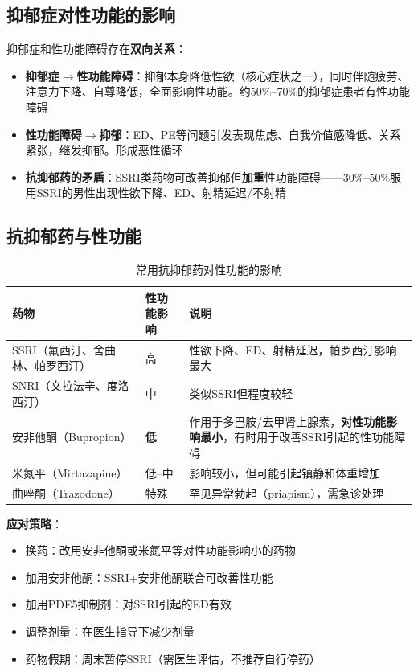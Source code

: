 \begin{enumerate}
\subsection{抑郁症对性功能的影响}

抑郁症和性功能障碍存在\textbf{双向关系}：

\begin{itemize}[leftmargin=2cm]
	\item \textbf{抑郁症$\rightarrow$性功能障碍}：抑郁本身降低性欲（核心症状之一），同时伴随疲劳、注意力下降、自尊降低，全面影响性功能。约50\%--70\%的抑郁症患者有性功能障碍
	\item \textbf{性功能障碍$\rightarrow$抑郁}：ED、PE等问题引发表现焦虑、自我价值感降低、关系紧张，继发抑郁。形成恶性循环
	\item \textbf{抗抑郁药的矛盾}：SSRI类药物可改善抑郁但\textbf{加重}性功能障碍——30\%--50\%服用SSRI的男性出现性欲下降、ED、射精延迟/不射精
\end{itemize}

\subsection{抗抑郁药与性功能}

\begin{table}[htbp]
\centering
\caption{常用抗抑郁药对性功能的影响}
\label{tab:antidepressants_sexual}
\begin{tabularx}{\textwidth}{@{}llX@{}}
    \toprule
    \textbf{药物} & \textbf{性功能影响} & \textbf{说明} \\
    \midrule
    SSRI（氟西汀、舍曲林、帕罗西汀） & 高 & 性欲下降、ED、射精延迟，帕罗西汀影响最大 \\
    SNRI（文拉法辛、度洛西汀） & 中 & 类似SSRI但程度较轻 \\
    安非他酮（Bupropion） & \textbf{低} & 作用于多巴胺/去甲肾上腺素，\textbf{对性功能影响最小}，有时用于改善SSRI引起的性功能障碍 \\
    米氮平（Mirtazapine） & 低--中 & 影响较小，但可能引起镇静和体重增加 \\
    曲唑酮（Trazodone） & 特殊 & 罕见异常勃起（priapism），需急诊处理 \\
    \bottomrule
\end{tabularx}
\end{table}

\textbf{应对策略}：
\begin{itemize}[leftmargin=2cm]
	\item 换药：改用安非他酮或米氮平等对性功能影响小的药物
	\item 加用安非他酮：SSRI+安非他酮联合可改善性功能
	\item 加用PDE5抑制剂：对SSRI引起的ED有效
	\item 调整剂量：在医生指导下减少剂量
	\item 药物假期：周末暂停SSRI（需医生评估，不推荐自行停药）
\end{itemize}


\end{enumerate}
